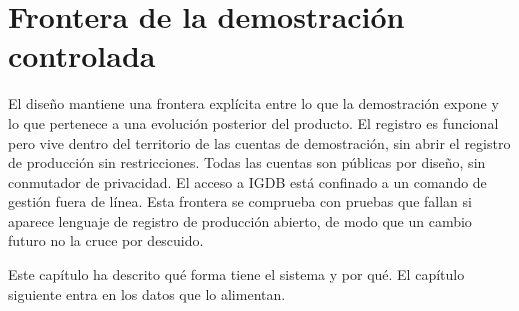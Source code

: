 \section{Frontera de la demostración controlada}\label{sec:dis-frontera}

El diseño mantiene una frontera explícita entre lo que la demostración expone y lo que
pertenece a una evolución posterior del producto. El registro es funcional pero vive
dentro del territorio de las cuentas de demostración, sin abrir el registro de producción sin
restricciones. Todas las cuentas son públicas por diseño, sin conmutador de privacidad. El
acceso a IGDB está confinado a un comando de gestión fuera de línea. Esta frontera se
comprueba con pruebas que fallan si aparece lenguaje de registro de producción abierto, de
modo que un cambio futuro no la cruce por descuido.

Este capítulo ha descrito qué forma tiene el sistema y por qué. El capítulo siguiente entra
en los datos que lo alimentan.
